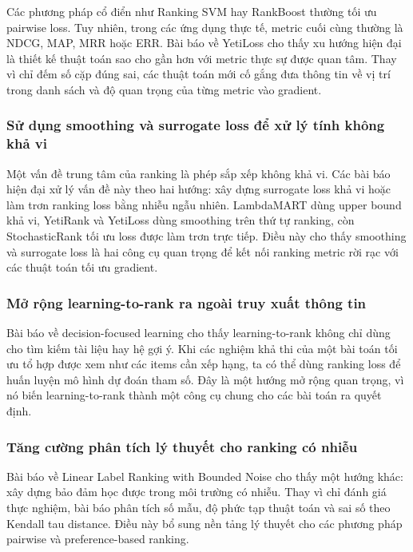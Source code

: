 Các phương pháp cổ điển như Ranking SVM hay RankBoost thường tối ưu pairwise loss. Tuy nhiên, trong các ứng dụng thực tế, metric cuối cùng thường là NDCG, MAP, MRR hoặc ERR. Bài báo về YetiLoss cho thấy xu hướng hiện đại là thiết kế thuật toán sao cho gần hơn với metric thực sự được quan tâm. Thay vì chỉ đếm số cặp đúng sai, các thuật toán mới cố gắng đưa thông tin về vị trí trong danh sách và độ quan trọng của từng metric vào gradient.

\subsubsection{Sử dụng smoothing và surrogate loss để xử lý tính không khả vi}

Một vấn đề trung tâm của ranking là phép sắp xếp không khả vi. Các bài báo hiện đại xử lý vấn đề này theo hai hướng: xây dựng surrogate loss khả vi hoặc làm trơn ranking loss bằng nhiễu ngẫu nhiên. LambdaMART dùng upper bound khả vi, YetiRank và YetiLoss dùng smoothing trên thứ tự ranking, còn StochasticRank tối ưu loss được làm trơn trực tiếp. Điều này cho thấy smoothing và surrogate loss là hai công cụ quan trọng để kết nối ranking metric rời rạc với các thuật toán tối ưu gradient.

\subsubsection{Mở rộng learning-to-rank ra ngoài truy xuất thông tin}

Bài báo về decision-focused learning cho thấy learning-to-rank không chỉ dùng cho tìm kiếm tài liệu hay hệ gợi ý. Khi các nghiệm khả thi của một bài toán tối ưu tổ hợp được xem như các items cần xếp hạng, ta có thể dùng ranking loss để huấn luyện mô hình dự đoán tham số. Đây là một hướng mở rộng quan trọng, vì nó biến learning-to-rank thành một công cụ chung cho các bài toán ra quyết định.

\subsubsection{Tăng cường phân tích lý thuyết cho ranking có nhiễu}

Bài báo về Linear Label Ranking with Bounded Noise cho thấy một hướng khác: xây dựng bảo đảm học được trong môi trường có nhiễu. Thay vì chỉ đánh giá thực nghiệm, bài báo phân tích số mẫu, độ phức tạp thuật toán và sai số theo Kendall tau distance. Điều này bổ sung nền tảng lý thuyết cho các phương pháp pairwise và preference-based ranking.

